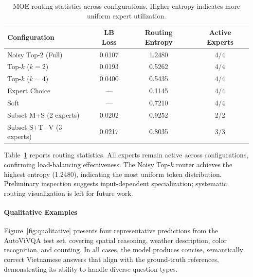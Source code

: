 \begin{table}[t]
\centering
\caption{MOE routing statistics across configurations. Higher entropy indicates more uniform expert utilization.}
\label{tab:routing_stats}
\begin{tabular}{lccc}
\toprule
Configuration & LB Loss & Routing Entropy & Active Experts \\
\midrule
Noisy Top-2 (Full) & 0.0107 & 1.2480 & 4/4 \\
Top-$k$ ($k{=}2$) & 0.0193 & 0.5262 & 4/4 \\
Top-$k$ ($k{=}4$) & 0.0400 & 0.5435 & 4/4 \\
Expert Choice & --- & 0.1145 & 4/4 \\
Soft & --- & 0.7210 & 4/4 \\
\midrule
Subset M+S (2 experts) & 0.0202 & 0.9252 & 2/2 \\
Subset S+T+V (3 experts) & 0.0217 & 0.8035 & 3/3 \\
\bottomrule
\end{tabular}
\end{table}

Table~\ref{tab:routing_stats} reports routing statistics. All experts remain active across configurations, confirming load-balancing effectiveness. The Noisy Top-$k$ router achieves the highest entropy (1.2480), indicating the most uniform token distribution. Preliminary inspection suggests input-dependent specialization; systematic routing visualization is left for future work.

\paragraph{Qualitative Examples}
Figure~\ref{fig:qualitative} presents four representative predictions from the AutoViVQA test set, covering spatial reasoning, weather description, color recognition, and counting. In all cases, the model produces concise, semantically correct Vietnamese answers that align with the ground-truth references, demonstrating its ability to handle diverse question types.

